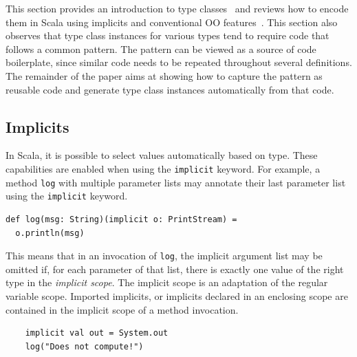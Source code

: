 \documentclass[preprint,nocopyrightspace]{sigplanconf}
\newcommand{\term}[1]{\mbox{\texttt{#1}}}
\begin{document}
This section provides an introduction to type classes~\cite{WadlerTypeClasses} and
reviews how to encode them in Scala using implicits and conventional
OO features~\cite{Oliveira2010}.  This section also observes that type
class instances for various types tend to require code that follows
a common pattern. The pattern can be viewed as a source of code
boilerplate, since similar code needs to be repeated throughout several
definitions. The remainder of the paper aims at showing how
to capture the pattern as reusable code and generate type class
instances automatically from that code.


%
%

\subsection{Implicits}
\label{sec:implicits}

In Scala, it is possible to select values
automatically based on type. These capabilities are enabled when using the
\term{implicit} keyword. For example, a method \term{log} with multiple
parameter lists may annotate their last parameter list using the
\term{implicit} keyword.%

\begin{lstlisting}
def log(msg: String)(implicit o: PrintStream) =
  o.println(msg)
\end{lstlisting}

This means that in an invocation of \term{log}, the implicit argument list may
be omitted if, for each parameter of that list, there is exactly one value of
the right type in the {\em implicit scope}. The implicit scope is an
adaptation of the regular variable scope. Imported implicits, or implicits
declared in an enclosing scope are contained in the implicit scope of a method
invocation.

\begin{lstlisting}
    implicit val out = System.out
    log("Does not compute!")
\end{lstlisting}
\end{document}
